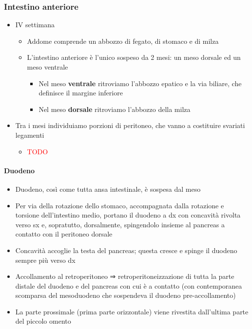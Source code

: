 \documentclass[italian,]{article}
\providecommand{\tightlist}{%
  \setlength{\itemsep}{0pt}\setlength{\parskip}{0pt}}
\newcommand{\TODO}[1]{\textcolor{red}{\textsf{\footnotesize{TODO #1}}}} %
\begin{document}
\hypertarget{intestino-anteriore}{%
\subsubsection{Intestino anteriore}\label{intestino-anteriore}}

\begin{itemize}
\tightlist
\item
  IV settimana

  \begin{itemize}
  \tightlist
  \item
    Addome comprende un abbozzo di fegato, di stomaco e di milza
  \item
    L'intestino anteriore è l'unico sospeso da 2 mesi: un meso dorsale
    ed un meso ventrale

    \begin{itemize}
    \tightlist
    \item
      Nel meso \textbf{ventrale} ritroviamo l'abbozzo epatico e la via
      biliare, che definisce il margine inferiore
    \item
      Nel meso \textbf{dorsale} ritroviamo l'abbozzo della milza
    \end{itemize}
  \end{itemize}
\item
  Tra i mesi individuiamo porzioni di peritoneo, che vanno a costituire
  svariati legamenti

  \begin{itemize}
  \item
    \TODO{}
  \end{itemize}
\end{itemize}

\hypertarget{duodeno-1}{%
\paragraph{Duodeno}\label{duodeno-1}}

\begin{itemize}
\tightlist
\item
  Duodeno, così come tutta ansa intestinale, è sospesa dal meso
\item
  Per via della rotazione dello stomaco, accompagnata dalla rotazione e
  torsione dell'intestino medio, portano il duodeno a dx con concavità
  rivolta verso sx e, sopratutto, dorsalmente, spingendolo insieme al
  pancreas a contatto con il peritoneo dorsale
\item
  Concavità accoglie la testa del pancreas; questa cresce e spinge il
  duodeno sempre più verso dx
\item
  Accollamento al retroperitoneo ⇒ retroperitoneizzazione di tutta la
  parte distale del duodeno e del pancreas con cui è a contatto (con
  contemporanea scomparsa del mesoduodeno che sospendeva il duodeno
  pre-accollamento)
\item
  La parte prossimale (prima parte orizzontale) viene rivestita
  dall'ultima parte del piccolo omento
\end{itemize}
\end{document}

